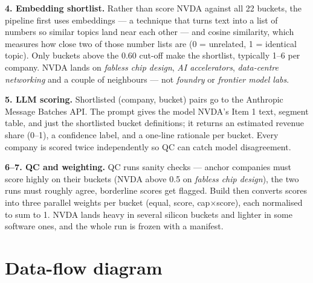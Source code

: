 \documentclass[11pt,a4paper,oneside]{article}
\begin{document}
\textbf{4. Embedding shortlist.} Rather than score NVDA against all 22 buckets, the pipeline first uses embeddings --- a technique that turns text into a list of numbers so similar topics land near each other --- and cosine similarity, which measures how close two of those number lists are (0 = unrelated, 1 = identical topic). Only buckets above the 0.60 cut-off make the shortlist, typically 1--6 per company. NVDA lands on \emph{fabless chip design}, \emph{AI accelerators}, \emph{data-centre networking} and a couple of neighbours --- not \emph{foundry} or \emph{frontier model labs}.

\textbf{5. LLM scoring.} Shortlisted (company, bucket) pairs go to the Anthropic Message Batches API. The prompt gives the model NVDA's Item 1 text, segment table, and just the shortlisted bucket definitions; it returns an estimated revenue share (0--1), a confidence label, and a one-line rationale per bucket. Every company is scored twice independently so QC can catch model disagreement.

\textbf{6--7. QC and weighting.} QC runs sanity checks --- anchor companies must score highly on their buckets (NVDA above 0.5 on \emph{fabless chip design}), the two runs must roughly agree, borderline scores get flagged. Build then converts scores into three parallel weights per bucket (equal, score, cap\(\times\)score), each normalised to sum to 1. NVDA lands heavy in several silicon buckets and lighter in some software ones, and the whole run is frozen with a manifest.

\section{Data-flow diagram}
\end{document}
